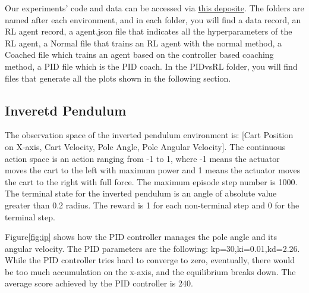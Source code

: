 \documentclass[journal]{IEEEtran}
\begin{document}
Our experiments' code and data can be accessed via \href{https://github.com/BaiLiping/Coaching}{this deposite}. The folders are named after each environment, and in each folder, you will find a data record, an RL agent record, a agent.json file that indicates all the hyperparameters of the RL agent, a Normal file that trains an RL agent with the normal method, a Coached file which trains an agent based on the controller based coaching method, a PID file which is the PID coach. In the PIDvsRL folder, you will find files that generate all the plots shown in the following section.
\subsection{Inveretd Pendulum}
The observation space of the inverted pendulum environment is: [Cart Position on X-axis, Cart Velocity, Pole Angle, Pole Angular Velocity]. The continuous action space is an action ranging from -1 to 1, where -1 means the actuator moves the cart to the left with maximum power and 1 means the actuator moves the cart to the right with full force. The maximum episode step number is 1000. The terminal state for the inverted pendulum is an angle of absolute value greater than 0.2 radius. The reward is 1 for each non-terminal step and 0 for the terminal step. 

Figure\ref{fig:ip} shows how the PID controller manages the pole angle and its angular velocity. The PID parameters are the following: kp=30,ki=0.01,kd=2.26. While the PID controller tries hard to converge to zero, eventually, there would be too much accumulation on the x-axis, and the equilibrium breaks down. The average score achieved by the PID controller is 240.
\end{document}

